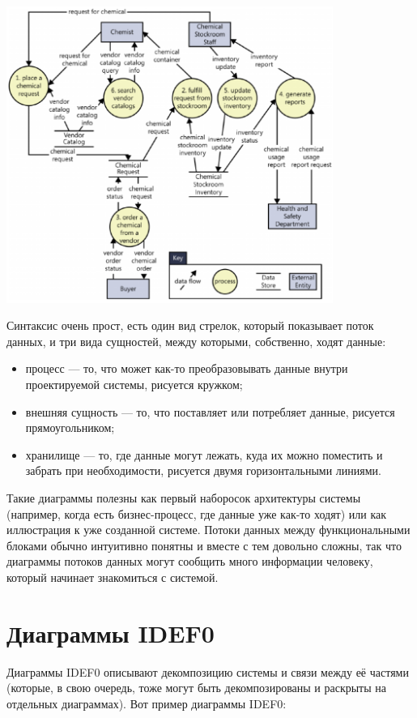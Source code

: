 \documentclass[a5paper]{article}
\begin{document}
\begin{center}
	\includegraphics[width=0.8\textwidth]{dfd.png}
\end{center}

Синтаксис очень прост, есть один вид стрелок, который показывает поток данных, и три вида сущностей, между которыми, собственно, ходят данные:

\begin{itemize}
	\item процесс --- то, что может как-то преобразовывать данные внутри проектируемой системы, рисуется кружком;
	\item внешняя сущность --- то, что поставляет или потребляет данные, рисуется прямоугольником;
	\item хранилище --- то, где данные могут лежать, куда их можно поместить и забрать при необходимости, рисуется двумя горизонтальными линиями.
\end{itemize}

Такие диаграммы полезны как первый наборосок архитектуры системы (например, когда есть бизнес-процесс, где данные уже как-то ходят) или как иллюстрация к уже созданной системе. Потоки данных между функциональными блоками обычно интуитивно понятны и вместе с тем довольно сложны, так что диаграммы потоков данных могут сообщить много информации человеку, который начинает знакомиться с системой.

\section{Диаграммы IDEF0}

Диаграммы IDEF0 описывают декомпозицию системы и связи между её частями (которые, в свою очередь, тоже могут быть декомпозированы и раскрыты на отдельных диаграммах). Вот пример диаграммы IDEF0:
\end{document}
